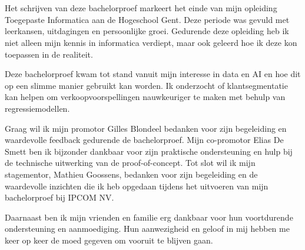 
\chapter*{}%
\label{ch:voorwoord}


Het schrijven van deze bachelorproef markeert het einde van mijn opleiding Toegepaste Informatica aan de Hogeschool Gent. Deze periode was gevuld met leerkansen, uitdagingen en persoonlijke groei. Gedurende deze opleiding heb ik niet alleen mijn kennis in informatica verdiept, maar ook geleerd hoe ik deze kon toepassen in de realiteit.

\vspace{1em}

Deze bachelorproef kwam tot stand vanuit mijn interesse in data en AI en hoe dit op een slimme manier gebruikt kan worden. Ik onderzocht of klantsegmentatie kan helpen om verkoopvoorspellingen nauwkeuriger te maken met behulp van regressiemodellen.

\vspace{1em}

Graag wil ik mijn promotor Gilles Blondeel bedanken voor zijn begeleiding en waardevolle feedback gedurende de bachelorproef. Mijn co-promotor Elias De Smett ben ik bijzonder dankbaar voor zijn praktische ondersteuning en hulp bij de technische uitwerking van de proof-of-concept. Tot slot wil ik mijn stagementor, Mathieu Goossens, bedanken voor zijn begeleiding en de waardevolle inzichten die ik heb opgedaan tijdens het uitvoeren van mijn bachelorproef bij IPCOM NV.

\vspace{1em}

Daarnaast ben ik mijn vrienden en familie erg dankbaar voor hun voortdurende ondersteuning en aanmoediging. Hun aanwezigheid en geloof in mij hebben me keer op keer de moed gegeven om vooruit te blijven gaan.


